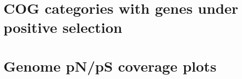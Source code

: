 \documentclass[12pt,chapterheads]{ucsd}
\begin{document}
\chapter{COG categories with genes under positive selection}\label{Appendix_COGselection}


\chapter{Genome pN/pS coverage plots}\label{Appendix_pNpS}


%



\end{document}

